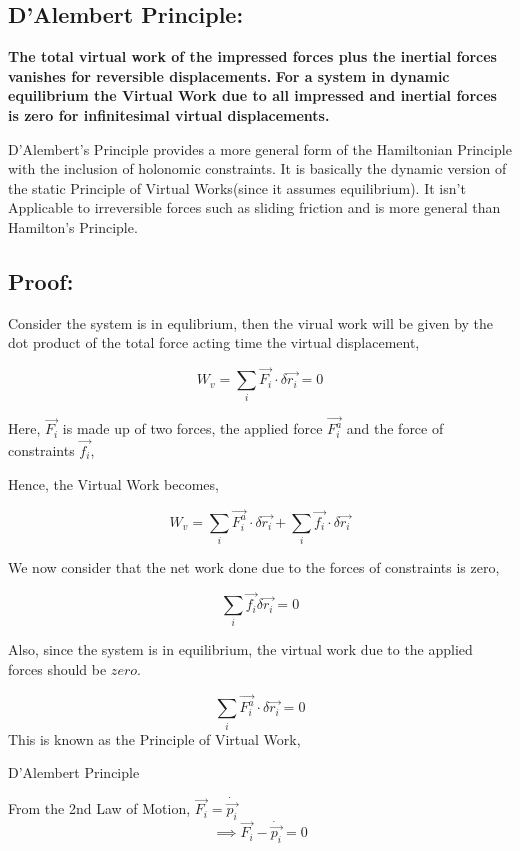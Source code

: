 \documentclass[a4paper]{article}
\begin{document}
		\subsection*{D'Alembert Principle: } 
			\textbf{The total virtual work of the impressed forces plus the inertial forces vanishes for reversible displacements.}
			\textbf{For a system in dynamic equilibrium the Virtual Work due to all impressed and inertial forces is zero for infinitesimal virtual displacements.}
			
		D'Alembert's Principle provides a more general form of the Hamiltonian Principle with the inclusion of holonomic constraints. It is basically the dynamic version of the static Principle of Virtual Works(since it assumes equilibrium).
		It isn't Applicable to irreversible forces such as sliding friction and is more general than Hamilton's Principle.

		\subsection*{Proof: }

			Consider the system is in equlibrium, then the virual work will be given by the dot product of the total force acting time the virtual displacement,

			$$ W_v = \sum_i \vec{F_i} \cdot \delta \vec{r_i} = 0 $$

			Here, $\vec{F_i}$ is made up of two forces, the applied force $\vec{F_i^a}$ and the force of constraints $\vec{f_i}$,

			Hence, the Virtual Work becomes,

			$$ W_v = \sum_i \vec{F_i^a} \cdot \delta \vec{r_i} + \sum_i \vec{f_i} \cdot \delta \vec{r_i} $$

			We now consider that the net work done due to the forces of constraints is zero, 

			$$ \sum_i \vec{f_i} \delta \vec{r_i} = 0 $$

			Also, since the system is in equilibrium, the virtual work due to the applied forces should be $zero$.

			\begin{equation}
				\sum_i \vec{F_i^a} \cdot \delta \vec{r_i} = 0 \label{eq_pvw} 
			\end{equation} 		
			This is known as the Principle of Virtual Work, 
			
			D'Alembert Principle
			
			From the 2nd Law of Motion, $\vec{F_i} = \dot{\vec{p_i}}$
			$$ \implies \vec{F_i} - \dot{\vec{p_i}} = 0 $$
			
\end{document}
